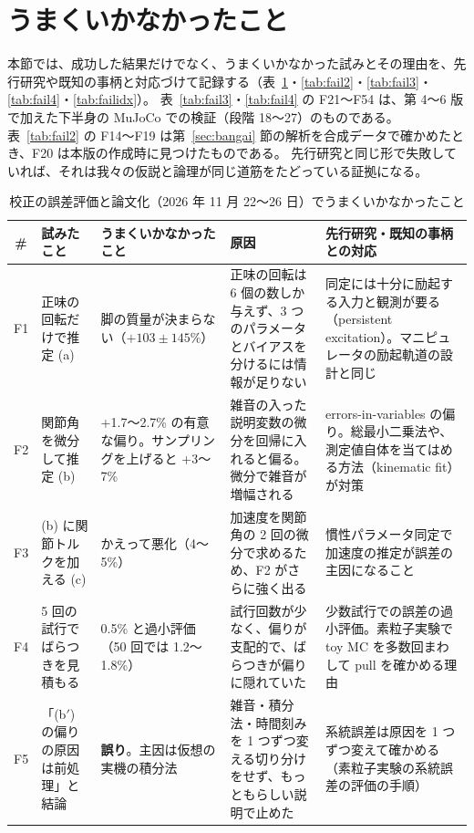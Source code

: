 \documentclass[paper=a4paper,fontsize=10pt,twocolumn,column_gap=2zw,line_length=24zw,number_of_lines=46,head_space=20mm]{jlreq}
\begin{document}
\section{うまくいかなかったこと}\label{sec:fail}

本節では、成功した結果だけでなく、うまくいかなかった試みとその理由を、先行研究や既知の事柄と対応づけて記録する（表~\ref{tab:fail}・\ref{tab:fail2}・\ref{tab:fail3}・\ref{tab:fail4}・\ref{tab:failidx}）。
表~\ref{tab:fail3}・\ref{tab:fail4} の F21〜F54 は、第 4〜6 版で加えた下半身の MuJoCo での検証（段階 18〜27）のものである。
表~\ref{tab:fail2} の F14〜F19 は第~\ref{sec:bangai} 節の解析を合成データで確かめたとき、F20 は本版の作成時に見つけたものである。
先行研究と同じ形で失敗していれば、それは我々の仮説と論理が同じ道筋をたどっている証拠になる。

\begin{table}[t]\centering\footnotesize
\caption{校正の誤差評価と論文化（2026 年 11 月 22〜26 日）でうまくいかなかったこと}\label{tab:fail}
\setlength{\tabcolsep}{3pt}
\begin{tabular}{cp{}p{}p{}p{}}\toprule
\# & 試みたこと & うまくいかなかったこと & 原因 & 先行研究・既知の事柄との対応 \\\midrule
F1 & 正味の回転だけで推定 (a) & 脚の質量が決まらない（$+103\pm145\%$） & 正味の回転は 6 個の数しか与えず、3 つのパラメータとバイアスを分けるには情報が足りない & 同定には十分に励起する入力と観測が要る（persistent excitation）。マニピュレータの励起軌道の設計と同じ \\
F2 & 関節角を微分して推定 (b) & +1.7〜2.7\% の有意な偏り。サンプリングを上げると +3〜7\% & 雑音の入った説明変数の微分を回帰に入れると偏る。微分で雑音が増幅される & errors-in-variables の偏り。総最小二乗法や、測定値自体を当てはめる方法（kinematic fit）が対策 \\
F3 & (b) に関節トルクを加える (c) & かえって悪化（4〜5\%） & 加速度を関節角の 2 回の微分で求めるため、F2 がさらに強く出る & 慣性パラメータ同定で加速度の推定が誤差の主因になること \cite{atkeson1986} \\
F4 & 5 回の試行でばらつきを見積もる & 0.5\% と過小評価（50 回では 1.2〜1.8\%） & 試行回数が少なく、偏りが支配的で、ばらつきが偏りに隠れていた & 少数試行での誤差の過小評価。素粒子実験で toy MC を多数回まわして pull を確かめる理由 \\
F5 & 「(b$'$) の偏りの原因は前処理」と結論 & \textbf{誤り}。主因は仮想の実機の積分法 & 雑音・積分法・時間刻みを 1 つずつ変える切り分けをせず、もっともらしい説明で止めた & 系統誤差は原因を 1 つずつ変えて確かめる（素粒子実験の系統誤差の評価の手順） \\

\end{tabular}
\end{table}
\end{document}
